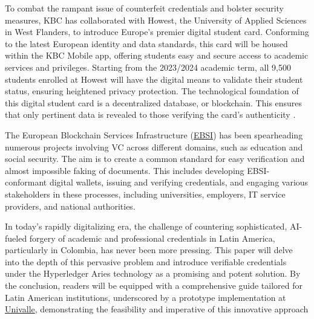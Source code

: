 To combat the rampant issue of counterfeit credentials and bolster security measures, KBC has collaborated with Howest, the University of Applied Sciences in West Flanders, to introduce Europe's premier digital student card. Conforming to the latest European identity and data standards, this card will be housed within the KBC Mobile app, offering students easy and secure access to academic services and privileges. Starting from the 2023/2024 academic term, all 9,500 students enrolled at Howest will have the digital means to validate their student status, ensuring heightened privacy protection. The technological foundation of this digital student card is a decentralized database, or blockchain. This ensures that only pertinent data is revealed to those verifying the card's authenticity \cite{kbc2023}.

The European Blockchain Services Infrastructure (\href{https://ec.europa.eu/digital-building-blocks/wikis/display/EBSI/Home}{EBSI}) has been spearheading numerous projects involving VC across different domains, such as education and social security. The aim is to create a common standard for easy verification and almost impossible faking of documents. This includes developing EBSI-conformant digital wallets, issuing and verifying credentials, and engaging various stakeholders in these processes, including universities, employers, IT service providers, and national authorities.

In today's rapidly digitalizing era, the challenge of countering sophisticated, AI-fueled forgery of academic and professional credentials in Latin America, particularly in Colombia, has never been more pressing. This paper will delve into the depth of this pervasive problem and introduce verifiable credentials under the Hyperledger Aries technology as a promising and potent solution. By the conclusion, readers will be equipped with a comprehensive guide tailored for Latin American institutions, underscored by a prototype implementation at \href{https://www.univalle.edu.co/}{Univalle}, demonstrating the feasibility and imperative of this innovative approach









